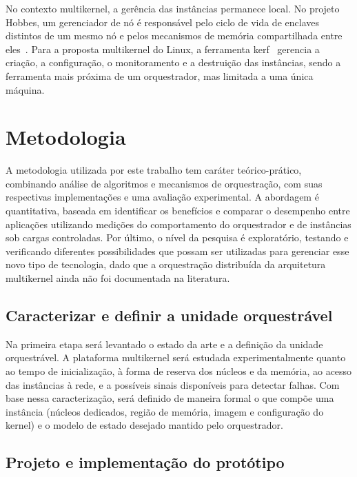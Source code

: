 \documentclass[12pt]{article}
\begin{document}
No contexto multikernel, a gerência das instâncias permanece local. No projeto Hobbes, um gerenciador de nó é
responsável pelo ciclo de vida de enclaves distintos de um mesmo nó e pelos mecanismos de memória compartilhada entre
eles~\cite{kocoloski2015composition}. Para a proposta multikernel do Linux, a ferramenta kerf~\cite{multikernel2025kerf}
gerencia a criação, a configuração, o monitoramento e a destruição das instâncias, sendo a ferramenta mais próxima
de um orquestrador, mas limitada a uma única máquina.

\section{Metodologia}\label{sec:methods}

A metodologia utilizada por este trabalho tem caráter teórico-prático, combinando análise de algoritmos e mecanismos de
orquestração, com suas respectivas implementações e uma avaliação experimental.
A abordagem é quantitativa, baseada em identificar os benefícios e comparar o desempenho
entre aplicações utilizando medições do comportamento do orquestrador e de instâncias sob cargas controladas.
Por último, o nível da pesquisa é exploratório, testando e verificando diferentes possibilidades que
possam ser utilizadas para gerenciar esse novo tipo de tecnologia, dado que a orquestração distribuída da arquitetura
multikernel ainda não foi documentada na literatura.


\subsection{Caracterizar e definir a unidade orquestrável}\label{subsec:caracterizar-e-definir-a-unidade-orquestravel}

Na primeira etapa será levantado o estado da arte e a definição da unidade orquestrável.
A plataforma multikernel será estudada experimentalmente quanto ao tempo de inicialização, à forma de reserva dos núcleos e
da memória, ao acesso das instâncias à rede, e a possíveis sinais disponíveis para detectar falhas.
Com base nessa caracterização, será definido de maneira formal o que compõe uma instância (núcleos
dedicados, região de memória, imagem e configuração do kernel) e o modelo de estado desejado mantido pelo orquestrador.

\subsection{Projeto e implementação do protótipo}\label{subsec:projeto-e-implementacao-do-prototipo}
\end{document}
